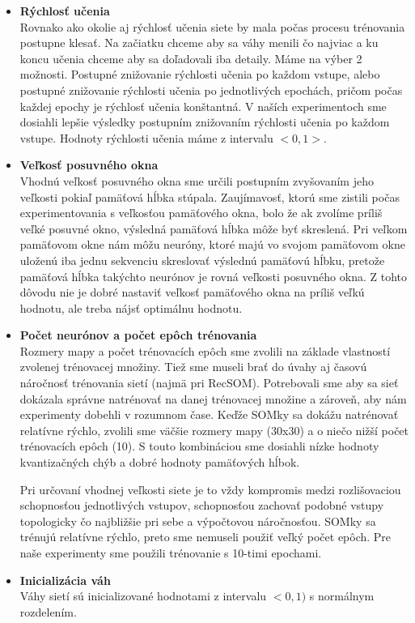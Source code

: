 \begin{itemize}
    \item \textbf{Rýchlosť učenia} \\
    Rovnako ako okolie aj rýchlosť učenia siete by mala počas
procesu trénovania postupne klesať. Na začiatku chceme aby sa váhy menili čo najviac
a ku koncu učenia chceme aby sa doľadovali iba detaily.
Máme na výber 2 možnosti. Postupné znižovanie rýchlosti učenia po každom vstupe, alebo 
postupné znižovanie rýchlosti učenia po jednotlivých epochách, pričom počas každej epochy
je rýchlosť učenia konštantná. 
V naších experimentoch sme dosiahli lepšie výsledky postupním 
znižovaním rýchlosti učenia po každom vstupe. 
Hodnoty rýchlosti učenia máme z intervalu $<0, 1>$.
    \item \textbf{Veľkosť posuvného okna} \\
    Vhodnú veľkosť posuvného okna sme určili postupním zvyšovaním jeho veľkosti pokiaľ pamäťová hĺbka stúpala. 
Zaujímavosť, ktorú sme zistili počas experimentovania s veľkosťou pamäťového okna, bolo že 
ak zvolíme príliš veľké posuvné okno, výsledná pamäťová hĺbka môže byť skreslená.
Pri veľkom pamäťovom okne nám môžu neuróny, ktoré majú vo svojom pamäťovom okne uloženú iba 
jednu sekvenciu skreslovať výslednú pamäťovú hĺbku, pretože pamäťová hĺbka takýchto
neurónov je rovná veľkosti posuvného okna. Z tohto dôvodu nie je dobré nastaviť veľkosť pamäťového okna na 
príliš veľkú hodnotu, ale treba nájsť optimálnu hodnotu.
    \item \textbf{Počet neurónov a počet epôch trénovania} \\
    Rozmery mapy a počet trénovacích epôch sme zvolili na základe vlastností zvolenej trénovacej množiny. 
Tiež sme museli brať do úvahy aj časovú náročnosť trénovania sietí (najmä pri RecSOM).
Potrebovali sme aby sa sieť dokázala správne natrénovať na danej trénovacej množine a zároveň, aby nám experimenty dobehli v rozumnom čase.
Keďže SOMky sa dokážu natrénovať relatívne rýchlo, zvolili sme väčšie rozmery mapy (30x30) a o niečo nižší počet trénovacích epôch (10).
S touto kombináciou sme dosiahli nízke hodnoty kvantizačných chýb a dobré hodnoty pamäťových hĺbok.

Pri určovaní vhodnej veľkosti siete je to vždy kompromis medzi rozlišovaciou schopnosťou jednotlivých vstupov, schopnosťou
zachovať podobné vstupy topologicky čo najbližšie pri sebe a výpočtovou náročnosťou. 
SOMky sa trénujú relatívne rýchlo, preto sme nemuseli použiť veľký počet epôch. Pre naše experimenty sme 
použili trénovanie s 10-timi epochami.
    \item \textbf{Inicializácia váh} \\ 
Váhy sietí sú inicializované hodnotami z intervalu $<0, 1)$ s normálnym rozdelením.
\end{itemize}


